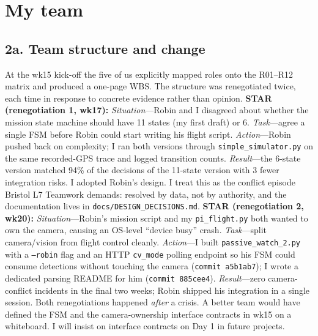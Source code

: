 \section{My team}

\subsection*{2a. Team structure and change }
\www At the wk15 kick-off the five of us explicitly mapped roles onto the R01--R12 matrix and produced a one-page WBS. The structure was renegotiated twice, each time in response to concrete evidence rather than opinion.
\textbf{STAR (renegotiation 1, wk17):} \emph{Situation}---Robin and I disagreed about whether the mission state machine should have 11 states (my first draft) or 6. \emph{Task}---agree a single FSM before Robin could start writing his flight script. \emph{Action}---Robin pushed back on complexity; I ran both versions through \texttt{simple\_simulator.py} on the same recorded-GPS trace and logged transition counts. \emph{Result}---the 6-state version matched 94\% of the decisions of the 11-state version with 3 fewer integration risks. I adopted Robin's design. I treat this as the conflict episode Bristol L7 Teamwork demands: resolved by data, not by authority, and the documentation lives in \texttt{docs/DESIGN\_DECISIONS.md}.
\textbf{STAR (renegotiation 2, wk20):} \emph{Situation}---Robin's mission script and my \texttt{pi\_flight.py} both wanted to own the camera, causing an OS-level ``device busy'' crash. \emph{Task}---split camera/vision from flight control cleanly. \emph{Action}---I built \texttt{passive\_watch\_2.py} with a \texttt{--robin} flag and an HTTP \texttt{cv\_mode} polling endpoint so his FSM could consume detections without touching the camera (\texttt{commit a5b1ab7}); I wrote a dedicated parsing README for him (\texttt{commit 885cee4}). \emph{Result}---zero camera-conflict incidents in the final two weeks; Robin shipped his integration in a single session.
\ebi Both renegotiations happened \emph{after} a crisis. A better team would have defined the FSM and the camera-ownership interface contracts in wk15 on a whiteboard. I will insist on interface contracts on Day 1 in future projects.

